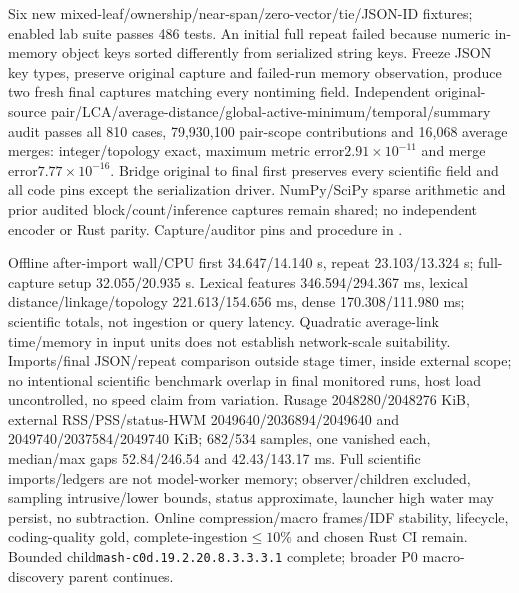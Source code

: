 \documentclass[11pt]{article}
\begin{document}
Six new mixed-leaf/ownership/near-span/zero-vector/tie/JSON-ID fixtures; enabled lab
suite passes 486 tests. An initial full repeat failed because numeric in-memory
object keys sorted differently from serialized string keys. Freeze JSON key types,
preserve original capture and failed-run memory observation, produce two fresh
final captures matching every nontiming field. Independent original-source
pair/LCA/average-distance/global-active-minimum/temporal/summary audit passes all
810 cases, 79,930,100 pair-scope contributions and 16,068 average merges:
integer/topology exact, maximum metric error$2.91\times10^{-11}$ and merge
error$7.77\times10^{-16}$. Bridge original to final first preserves every scientific
field and all code pins except the serialization driver. NumPy/SciPy sparse
arithmetic and prior audited block/count/inference captures remain shared; no
independent encoder or Rust parity. Capture/auditor pins and procedure in
.

Offline after-import wall/CPU first 34.647/14.140 s, repeat 23.103/13.324 s;
full-capture setup 32.055/20.935 s. Lexical features 346.594/294.367 ms,
lexical distance/linkage/topology 221.613/154.656 ms, dense 170.308/111.980 ms;
scientific totals, not ingestion or query latency. Quadratic average-link
time/memory in input units does not establish network-scale suitability.
Imports/final JSON/repeat comparison outside stage timer, inside external scope;
no intentional scientific benchmark overlap in final monitored runs, host load
uncontrolled, no speed claim from variation. Rusage 2048280/2048276 KiB, external
RSS/PSS/status-HWM 2049640/2036894/2049640 and 2049740/2037584/2049740 KiB;
682/534 samples, one vanished each, median/max gaps 52.84/246.54 and 42.43/143.17 ms.
Full scientific imports/ledgers are not model-worker memory; observer/children
excluded, sampling intrusive/lower bounds, status approximate, launcher high
water may persist, no subtraction. Online compression/macro frames/IDF stability,
lifecycle, coding-quality gold, complete-ingestion$\le10\%$ and chosen Rust CI
remain. Bounded child\texttt{mash-c0d.19.2.20.8.3.3.3.1} complete; broader
P0 macro-discovery parent continues.
\end{document}
